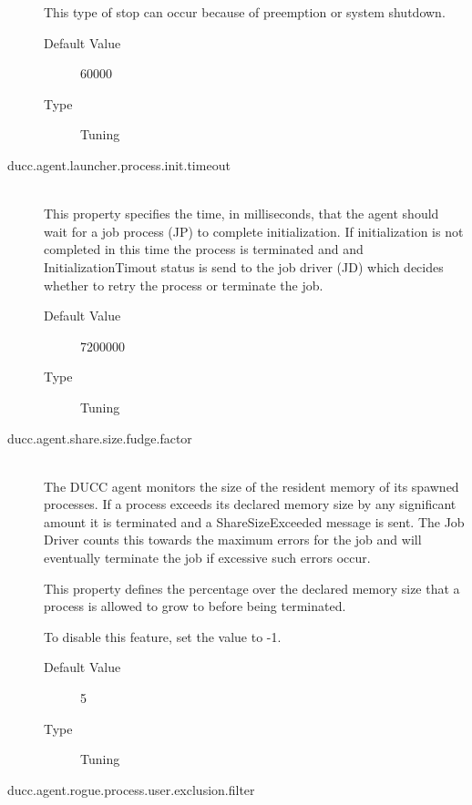 \begin{description}
          This type of stop can occur because of preemption or system shutdown. 
          \begin{description}
            \item[Default Value] 60000 
            \item[Type] Tuning 
          \end{description}
          
        \item[ducc.agent.launcher.process.init.timeout] \hfill \\
          This property specifies the time, in milliseconds, that the agent should wait for a job 
          process (JP) to complete initialization. If initialization is not completed in this time the 
          process is terminated and and InitializationTimout status is send to the job driver (JD) 
          which decides whether to retry the process or terminate the job. 

          \begin{description}
          \item[Default Value] 7200000 
          \item[Type] Tuning 
          \end{description}
          

        \item[ducc.agent.share.size.fudge.factor] \hfill \\

          The DUCC agent monitors the size of the resident memory of its spawned processes. If a 
          process exceeds its declared memory size by any significant amount it is terminated and 
          a ShareSizeExceeded message is sent. The Job Driver counts this towards the maximum 
          errors for the job and will eventually terminate the job if excessive such errors occur. 

          This property defines the percentage over the declared memory size that a process is 
          allowed to grow to before being terminated. 

          To disable this feature, set the value to -1. 
          \begin{description}
            \item[Default Value] 5 
            \item[Type] Tuning 
          \end{description}
          
          \item[ducc.agent.rogue.process.user.exclusion.filter] \hfill \\
          \label{itm:props-rogue.user}


\end{description}
